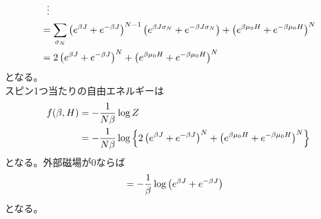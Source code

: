 \documentclass[dvipdfmx, 11pt, a4paper]{jsarticle}
\theoremstyle{definition}
\begin{document}
\begin{align}
        &\ \ \vdots \notag \\
        &= \sum_{\sigma_N} \left( e^{\beta J} + e^{-\beta J} \right)^{N-1} \left( e^{\beta J\sigma_{N}} + e^{-\beta J\sigma_{N}} \right) + \left( e^{\beta \mu_0 H} + e^{-\beta \mu_0 H}\right)^N \notag \\
        &= 2\left( e^{\beta J} + e^{-\beta J} \right)^N + \left( e^{\beta \mu_0 H} + e^{-\beta \mu_0 H}\right)^N
    \end{align}
    となる。\\
    スピン1つ当たりの自由エネルギーは
    \begin{align}
        f(\beta,H) &= -\frac{1}{N\beta} \log Z \notag \\
        &= -\frac{1}{N\beta} \log \left\{ 2\left( e^{\beta J} + e^{-\beta J} \right)^N +  \left( e^{\beta \mu_0 H} + e^{-\beta \mu_0 H}\right)^N\right\} 
    \end{align}
    となる。外部磁場が0ならば
    \begin{align}
        &= -\frac{1}{\beta} \log \left( e^{\beta J} + e^{-\beta J} \right) \notag 
    \end{align}
    となる。
\end{document}
